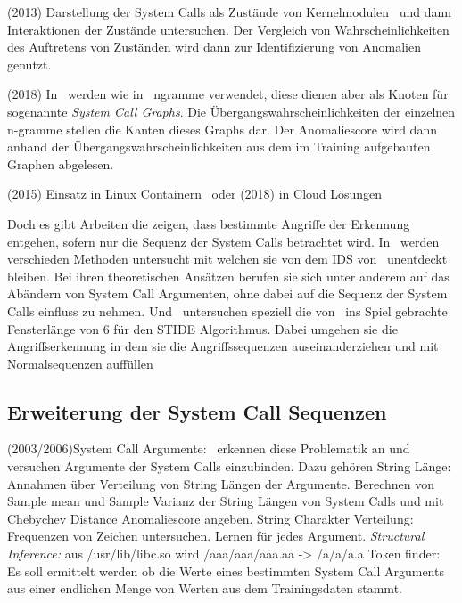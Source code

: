             (2013) Darstellung der System Calls als Zustände von Kernelmodulen~\cite{SYSTEM_STATES} und dann Interaktionen der Zustände untersuchen. 
            Der Vergleich von Wahrscheinlichkeiten des Auftretens von Zuständen wird dann zur Identifizierung von Anomalien genutzt.

            (2018) In~\cite{SYSCALL_GRAPHS} werden wie in~\cite{STIDE_Alternatives} ngramme verwendet, diese dienen aber als Knoten für sogenannte \textit{System Call Graphs}. 
            Die Übergangswahrscheinlichkeiten der einzelnen n-gramme stellen die Kanten dieses Graphs dar.
            Der Anomaliescore wird dann anhand der Übergangswahrscheinlichkeiten aus dem im Training aufgebauten Graphen abgelesen.

            (2015) Einsatz in Linux Containern~\cite{FREQUENCY1} oder (2018) in Cloud Lösungen~\cite{VM}

        Doch es gibt Arbeiten die zeigen, dass bestimmte Angriffe der Erkennung entgehen, sofern nur die Sequenz der System Calls betrachtet wird.
        In~\cite{Syscallseqexploit1} werden verschieden Methoden untersucht mit welchen sie von dem IDS von~\cite{FORREST2000} unentdeckt bleiben.
        Bei ihren theoretischen Ansätzen berufen sie sich unter anderem auf das Abändern von System Call Argumenten, ohne dabei auf die Sequenz der System Calls einfluss zu nehmen.
        Und~\cite{Syscallseqexploit3} untersuchen speziell die von~\cite{FORREST} ins Spiel gebrachte Fensterlänge von $6$ für den STIDE Algorithmus.
        Dabei umgehen sie die Angriffserkennung in dem sie die Angriffssequenzen auseinanderziehen und mit Normalsequenzen auffüllen


    \subsection{Erweiterung der System Call Sequenzen}

        (2003/2006)System Call Argumente:~\cite{ARGUMENTS, ARGUMENTS2} erkennen diese Problematik an und versuchen Argumente der System Calls einzubinden.
        Dazu gehören String Länge: Annahmen über Verteilung von String Längen der Argumente. 
            Berechnen von Sample mean und Sample Varianz der String Längen von System Calls und mit Chebychev Distance Anomaliescore angeben.
        String Charakter Verteilung: Frequenzen von Zeichen untersuchen. Lernen für jedes Argument.
        \textit{Structural Inference:} aus /usr/lib/libc.so wird /aaa/aaa/aaa.aa -> /a/a/a.a  
        Token finder: Es soll ermittelt werden ob die Werte eines bestimmten System Call Arguments aus einer endlichen Menge von Werten aus dem Trainingsdaten stammt.
        
